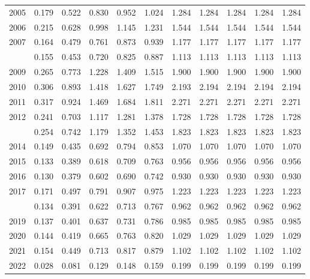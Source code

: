 \documentclass[
]{article}
\begin{document}
\begin{longtable}[t]{lrrrrrrrrrr}
2005 & 0.179 & 0.522 & 0.830 & 0.952 & 1.024 & 1.284 & 1.284 & 1.284 & 1.284 & 1.284\\
2006 & 0.215 & 0.628 & 0.998 & 1.145 & 1.231 & 1.544 & 1.544 & 1.544 & 1.544 & 1.544\\
2007 & 0.164 & 0.479 & 0.761 & 0.873 & 0.939 & 1.177 & 1.177 & 1.177 & 1.177 & 1.177\\
\addlinespace
2008 & 0.155 & 0.453 & 0.720 & 0.825 & 0.887 & 1.113 & 1.113 & 1.113 & 1.113 & 1.113\\
2009 & 0.265 & 0.773 & 1.228 & 1.409 & 1.515 & 1.900 & 1.900 & 1.900 & 1.900 & 1.900\\
2010 & 0.306 & 0.893 & 1.418 & 1.627 & 1.749 & 2.193 & 2.194 & 2.194 & 2.194 & 2.194\\
2011 & 0.317 & 0.924 & 1.469 & 1.684 & 1.811 & 2.271 & 2.271 & 2.271 & 2.271 & 2.271\\
2012 & 0.241 & 0.703 & 1.117 & 1.281 & 1.378 & 1.728 & 1.728 & 1.728 & 1.728 & 1.728\\
\addlinespace
2013 & 0.254 & 0.742 & 1.179 & 1.352 & 1.453 & 1.823 & 1.823 & 1.823 & 1.823 & 1.823\\
2014 & 0.149 & 0.435 & 0.692 & 0.794 & 0.853 & 1.070 & 1.070 & 1.070 & 1.070 & 1.070\\
2015 & 0.133 & 0.389 & 0.618 & 0.709 & 0.763 & 0.956 & 0.956 & 0.956 & 0.956 & 0.956\\
2016 & 0.130 & 0.379 & 0.602 & 0.690 & 0.742 & 0.930 & 0.930 & 0.930 & 0.930 & 0.930\\
2017 & 0.171 & 0.497 & 0.791 & 0.907 & 0.975 & 1.223 & 1.223 & 1.223 & 1.223 & 1.223\\
\addlinespace
2018 & 0.134 & 0.391 & 0.622 & 0.713 & 0.767 & 0.962 & 0.962 & 0.962 & 0.962 & 0.962\\
2019 & 0.137 & 0.401 & 0.637 & 0.731 & 0.786 & 0.985 & 0.985 & 0.985 & 0.985 & 0.985\\
2020 & 0.144 & 0.419 & 0.665 & 0.763 & 0.820 & 1.029 & 1.029 & 1.029 & 1.029 & 1.029\\
2021 & 0.154 & 0.449 & 0.713 & 0.817 & 0.879 & 1.102 & 1.102 & 1.102 & 1.102 & 1.102\\
2022 & 0.028 & 0.081 & 0.129 & 0.148 & 0.159 & 0.199 & 0.199 & 0.199 & 0.199 & 0.199\\*
\end{longtable}
\end{document}
